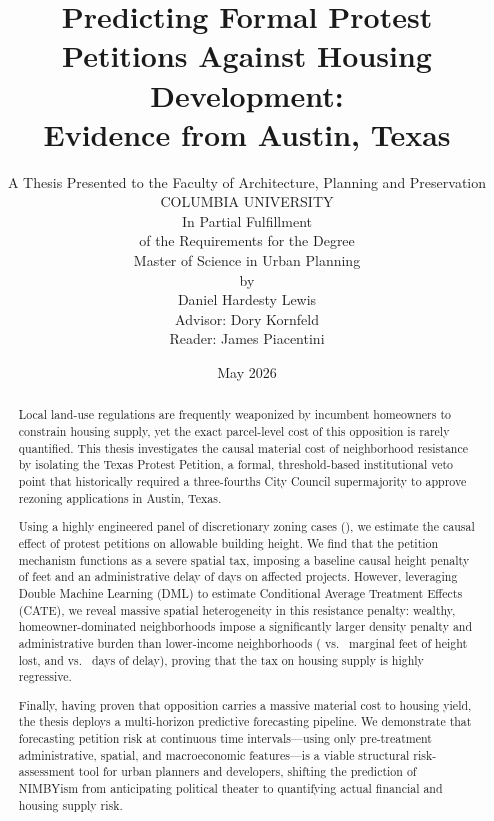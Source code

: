 \documentclass[11pt, letterpaper, oneside]{article}
\title{\vspace{-2em}\LARGE\bfseries Predicting Formal Protest Petitions Against Housing Development:\\[0.4em]
Evidence from Austin, Texas}
\author{
\normalsize A Thesis Presented to the Faculty of Architecture, Planning and Preservation\\
\normalsize COLUMBIA UNIVERSITY\\[1em]
\normalsize In Partial Fulfillment\\[0.2em]
\normalsize of the Requirements for the Degree\\[0.2em]
\normalsize Master of Science in Urban Planning\\[1.5em]
\normalsize by\\[0.5em]
\normalsize Daniel Hardesty Lewis\\[1.5em]
\normalsize Advisor: Dory Kornfeld\\[0.2em]
\normalsize Reader: James Piacentini}
\date{\normalsize May 2026}
\begin{document}
\pagestyle{plain} %
\sloppy
\maketitle

{\singlespacing

\newpage
\begin{abstract}
Local land-use regulations are frequently weaponized by incumbent homeowners to constrain housing supply, yet the exact parcel-level cost of this opposition is rarely quantified. This thesis investigates the causal material cost of neighborhood resistance by isolating the Texas Protest Petition, a formal, threshold-based institutional veto point that historically required a three-fourths City Council supermajority to approve rezoning applications in Austin, Texas.

Using a highly engineered panel of discretionary zoning cases (\metricStudyYears{}), we estimate the causal effect of protest petitions on allowable building height. We find that the petition mechanism functions as a severe spatial tax, imposing a baseline causal height penalty of \metricRobustTreatContinuous{} feet and an administrative delay of \metricMeanDelayPenalty{} days on affected projects. However, leveraging Double Machine Learning (DML) to estimate Conditional Average Treatment Effects (CATE), we reveal massive spatial heterogeneity in this resistance penalty: wealthy, homeowner-dominated neighborhoods impose a significantly larger density penalty and administrative burden than lower-income neighborhoods (\metricCATEIncomeFourHeightMean{} vs.\ \metricCATEIncomeOneHeightMean{} marginal feet of height lost, and \metricCATEIncomeFourDelayMean{} vs.\ \metricCATEIncomeOneDelayMean{} days of delay), proving that the tax on housing supply is highly regressive.

Finally, having proven that opposition carries a massive material cost to housing yield, the thesis deploys a multi-horizon predictive forecasting pipeline. We demonstrate that forecasting petition risk at continuous time intervals---using only pre-treatment administrative, spatial, and macroeconomic features---is a viable structural risk-assessment tool for urban planners and developers, shifting the prediction of NIMBYism from anticipating political theater to quantifying actual financial and housing supply risk.
\end{abstract}

}
\end{document}
